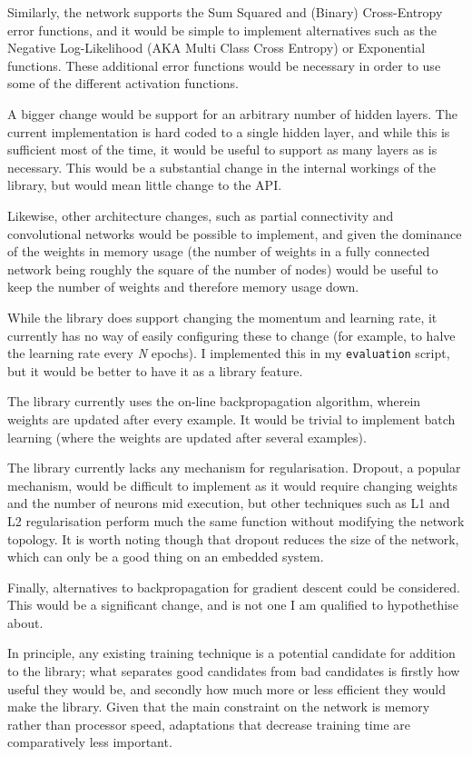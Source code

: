 \documentclass[a4paper]{article}
\begin{document}
Similarly, the network supports the Sum Squared and (Binary) Cross-Entropy error functions, and it would be simple to implement alternatives such as the Negative Log-Likelihood (AKA Multi Class Cross Entropy) or Exponential functions. These additional error functions would be necessary in order to use some of the different activation functions. 

A bigger change would be support for an arbitrary number of hidden layers. The current implementation is hard coded to a single hidden layer, and while this is sufficient most of the time, it would be useful to support as many layers as is necessary. 
This would be a substantial change in the internal workings of the library, but would mean little change to the API.

Likewise, other architecture changes, such as partial connectivity and convolutional networks would be possible to implement, and given the dominance of the weights in memory usage (the number of weights in a fully connected network being roughly the square of the number of nodes) would be useful to keep the number of weights and therefore memory usage down.

While the library does support changing the momentum and learning rate, it currently has no way of easily configuring these to change (for example, to halve the learning rate every \textit{N} epochs). I implemented this in my \lstinline{evaluation} script, but it would be better to have it as a library feature.

The library currently uses the on-line backpropagation algorithm, wherein weights are updated after every example. It would be trivial to implement batch learning (where the weights are updated after several examples). 

The library currently lacks any mechanism for regularisation. Dropout, a popular mechanism, would be difficult to implement as it would require changing weights and the number of neurons mid execution, but other techniques such as L1 and L2 regularisation perform much the same function without modifying the network topology. It is worth noting though that dropout reduces the size of the network, which can only be a good thing on an embedded system.

Finally, alternatives to backpropagation for gradient descent could be considered. This would be a significant change, and is not one I am qualified to hypothethise about.

In principle, any existing training technique is a potential candidate for addition to the library; what separates good candidates from bad candidates is firstly how useful they would be, and secondly how much more or less efficient they would make the library. Given that the main constraint on the network is memory rather than processor speed, adaptations that decrease training time are comparatively less important.
\end{document}
